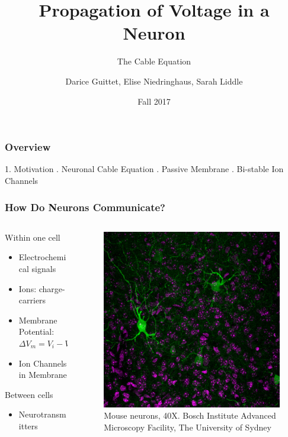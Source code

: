 \documentclass{beamer}
\title{Propagation of Voltage in a Neuron}
\subtitle{The Cable Equation}
\author{Darice Guittet, Elise Niedringhaus, Sarah Liddle}
\date{Fall 2017}
\begin{document}
 
\frame{\titlepage}
 
\begin{frame}
\frametitle{Overview}
1. Motivation \newline {}. Neuronal Cable Equation \newline {}. Passive Membrane \newline {}. Bi-stable Ion Channels
\end{frame}

\begin{frame}
\frametitle{How Do Neurons Communicate?}
\begin{columns}
    \begin{column}{.5\textwidth}
    Within one cell
    \begin{itemize}
	\item Electrochemical signals
	\item Ions: charge-carriers
	\item Membrane Potential: $\Delta V_m = V_i - V_e$
	\item Ion Channels in Membrane \newline
	\end{itemize}
	Between cells
	\begin{itemize}
	\item Neurotransmitters
\end{itemize}
    \end{column}
    
    \begin{column}{.5\textwidth}
    \begin{figure}[H]\label{neuron}
    \includegraphics[width=\textwidth]{OConnor-InhibitoryInterneurons1}
	\caption{Mouse neurons, 40X. Bosch Institute Advanced Microscopy Facility, The University of Sydney}
    \end{figure}
    

\end{column}
\end{columns}
\end{frame}
\end{document}
